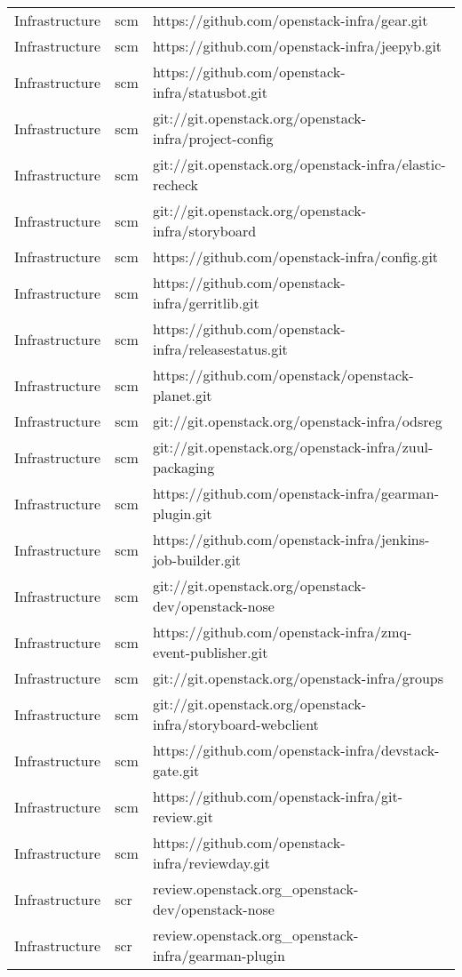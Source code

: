 \begin{center}
\begin{longtable}{|p{4cm}|p{1cm}|p{10cm}|}
Infrastructure&scm&https://github.com/openstack-infra/gear.git\\ 
Infrastructure&scm&https://github.com/openstack-infra/jeepyb.git\\ 
Infrastructure&scm&https://github.com/openstack-infra/statusbot.git\\ 
Infrastructure&scm&git://git.openstack.org/openstack-infra/project-config\\ 
Infrastructure&scm&git://git.openstack.org/openstack-infra/elastic-recheck\\ 
Infrastructure&scm&git://git.openstack.org/openstack-infra/storyboard\\ 
Infrastructure&scm&https://github.com/openstack-infra/config.git\\ 
Infrastructure&scm&https://github.com/openstack-infra/gerritlib.git\\ 
Infrastructure&scm&https://github.com/openstack-infra/releasestatus.git\\ 
Infrastructure&scm&https://github.com/openstack/openstack-planet.git\\ 
Infrastructure&scm&git://git.openstack.org/openstack-infra/odsreg\\ 
Infrastructure&scm&git://git.openstack.org/openstack-infra/zuul-packaging\\ 
Infrastructure&scm&https://github.com/openstack-infra/gearman-plugin.git\\ 
Infrastructure&scm&https://github.com/openstack-infra/jenkins-job-builder.git\\ 
Infrastructure&scm&git://git.openstack.org/openstack-dev/openstack-nose\\ 
Infrastructure&scm&https://github.com/openstack-infra/zmq-event-publisher.git\\ 
Infrastructure&scm&git://git.openstack.org/openstack-infra/groups\\ 
Infrastructure&scm&git://git.openstack.org/openstack-infra/storyboard-webclient\\ 
Infrastructure&scm&https://github.com/openstack-infra/devstack-gate.git\\ 
Infrastructure&scm&https://github.com/openstack-infra/git-review.git\\ 
Infrastructure&scm&https://github.com/openstack-infra/reviewday.git\\ 
Infrastructure&scr&review.openstack.org\_openstack-dev/openstack-nose\\ 
Infrastructure&scr&review.openstack.org\_openstack-infra/gearman-plugin\\ 

\end{longtable}
\end{center}
